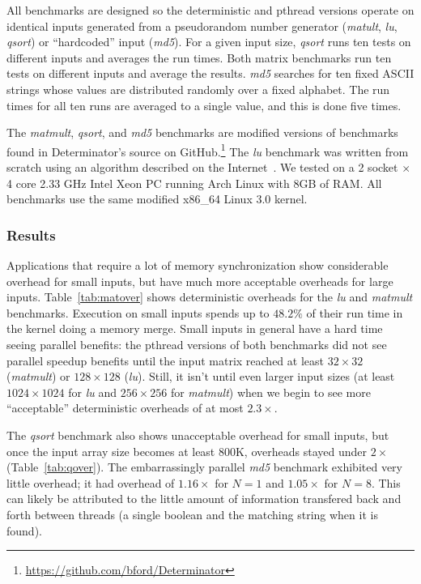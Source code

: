 All benchmarks are designed so the deterministic and pthread versions operate on
identical inputs generated from a pseudorandom number generator (\emph{matult},
\emph{lu}, \emph{qsort}) or ``hardcoded'' input (\emph{md5}).
For a given input size, \emph{qsort} runs ten tests on different inputs and
averages the run times. Both matrix benchmarks run ten tests on different inputs
and average the results. \emph{md5} searches for ten fixed ASCII strings
whose values are distributed randomly over a fixed alphabet. The run times for
all ten runs are averaged to a single value, and this is done five times.

The \emph{matmult}, \emph{qsort}, and \emph{md5} benchmarks are modified
versions of benchmarks found in Determinator's source on
GitHub.\footnote{\url{https://github.com/bford/Determinator}}
The \emph{lu} benchmark was written from scratch using an algorithm described
on the Internet~\cite{lualg}. We tested on a 2 socket $\times$ 4 core 2.33 GHz
Intel Xeon PC running Arch Linux with 8GB of RAM. All benchmarks use the same
modified \mbox{x86\_64} Linux 3.0 kernel.

\subsubsection{Results}
Applications that require a lot of memory synchronization show considerable
overhead for small inputs, but have much more acceptable overheads for large
inputs.
\mbox{Table \ref{tab:matover}} shows deterministic overheads for the \emph{lu}
and \emph{matmult} benchmarks.
Execution on small inputs spends up to $48.2\%$ of their run time in the kernel
doing a memory merge.
Small inputs in general have a hard time seeing parallel benefits: the pthread
versions of both benchmarks did not see parallel speedup benefits until the
input matrix reached at least $32\times 32$ (\emph{matmult}) or $128\times 128$
(\emph{lu}). Still, it isn't until even larger
input sizes (at least $1024\times 1024$ for \emph{lu} and $256\times 256$ for
\emph{matmult}) when we begin to
see more ``acceptable'' deterministic overheads of at
most $2.3\times$.

The \emph{qsort} benchmark also shows unacceptable overhead for small inputs,
but once the input array size becomes at least 800K, overheads stayed under
$2\times$ (\mbox{Table \ref{tab:qover}}).
The embarrassingly parallel \emph{md5} benchmark exhibited very little overhead;
it had overhead of $1.16\times$ for $N=1$ and $1.05\times$ for $N=8$. This
can likely be attributed to the little amount of information transfered back and
forth between threads (a single boolean and the matching string when it is
found).

